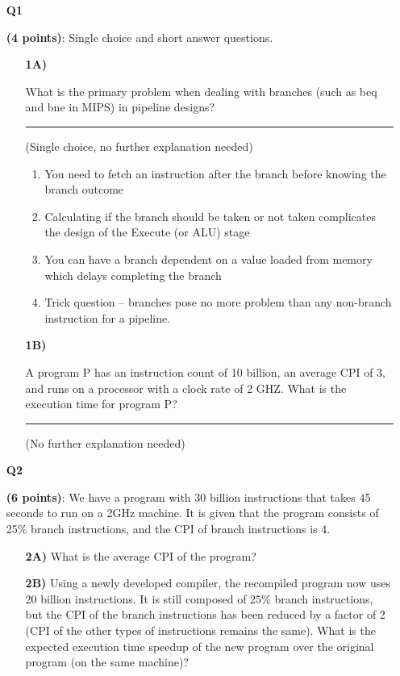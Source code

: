 \documentclass[a4paper,10pt]{article}
\begin{document}
\pagebreak

\begin{enumerate}
    \item[\textbf{Q1}]{\textbf{(4 points)}: 
        Single choice and short answer questions. \\
        \begin{enumerate}
            \item[\textbf{1A)}]{What is the primary problem when dealing with branches (such as beq and bne in MIPS) in pipeline designs? \rule{3cm}{0.4pt} (Single choice, no further explanation needed)
                \begin{enumerate}
                    \item {You need to fetch an instruction after the branch before knowing the branch outcome}
                    \item {Calculating if the branch should be taken or not taken complicates the design of the Execute (or ALU) stage}
                    \item {You can have a branch dependent on a value loaded from memory which delays completing the branch}
                    \item {Trick question -- branches pose no more problem than any non-branch instruction for a pipeline.}
                \end{enumerate}
            }
            \item[\textbf{1B)}]{A program P has an instruction count of 10 billion, an average CPI of 3, and runs on a processor with a clock rate of 2 GHZ. What is the execution time for program P? \\\rule{3cm}{0.4pt} (No further explanation needed)}
        \end{enumerate}
    }
    \item[\textbf{Q2}]{\textbf{(6 points)}: 
        We have a program with 30 billion instructions that takes 45 seconds to run on a 2GHz machine. It is given that the program consists of 25\% branch instructions, and the CPI of branch instructions is 4.
         \begin{enumerate}
            \item[\textbf{2A)}]{What is the average CPI of the program?}
            \vspace{2cm}
            \item[\textbf{2B)}]{Using a newly developed compiler, the recompiled program now uses 20 billion instructions. It is still composed of 25\% branch instructions, but the CPI of the branch instructions has been reduced by a factor of 2 (CPI of the other types of instructions remains the same). What is the expected execution time speedup of the new program over the original program (on the same machine)?}

\end{enumerate}}
\end{enumerate}
\end{document}
